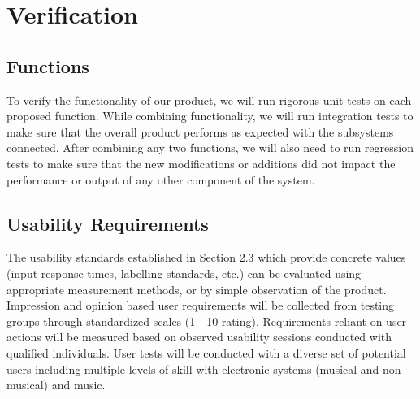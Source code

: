 \section{Verification}


\subsection{Functions}
    
    To verify the functionality of our product, we will run rigorous unit tests on each proposed function. While combining functionality, we will run integration tests to make sure that the overall product performs as expected with the subsystems connected. After combining any two functions, we will also need to run regression tests to make sure that the new modifications or additions did not impact the performance or output of any other component of the system.
    
   
\subsection{Usability Requirements}
The usability standards established in Section 2.3 which provide concrete values (input response times, labelling standards, etc.) can be evaluated using appropriate measurement methods, or by simple observation of the product. Impression and opinion based user requirements will be collected from testing groups through standardized scales (1 - 10 rating). Requirements reliant on user actions will be measured based on observed usability sessions conducted with qualified individuals. User tests will be conducted with a diverse set of potential users including multiple levels of skill with electronic systems (musical and non-musical) and music. 


